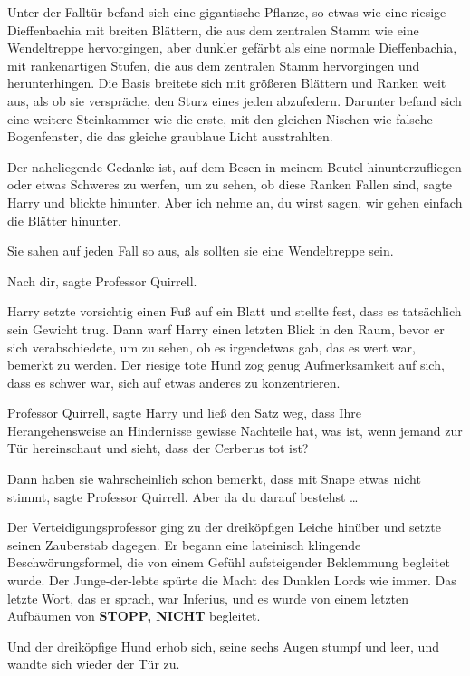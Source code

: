 Unter der Falltür befand sich eine gigantische Pflanze, so etwas wie eine
riesige Dieffenbachia mit breiten Blättern, die aus dem zentralen Stamm wie eine
Wendeltreppe hervorgingen, aber dunkler gefärbt als eine normale Dieffenbachia,
mit rankenartigen Stufen, die aus dem zentralen Stamm hervorgingen und
herunterhingen. Die Basis breitete sich mit größeren Blättern und Ranken weit
aus, als ob sie verspräche, den Sturz eines jeden abzufedern. Darunter befand
sich eine weitere Steinkammer wie die erste, mit den gleichen Nischen wie
falsche Bogenfenster, die das gleiche graublaue Licht ausstrahlten.

\glqq{}Der naheliegende Gedanke ist, auf dem Besen in meinem Beutel
hinunterzufliegen oder etwas Schweres zu werfen, um zu sehen, ob diese Ranken
Fallen sind\grqq{}, sagte Harry und blickte hinunter. \glqq{}Aber ich nehme an,
du wirst sagen, wir gehen einfach die Blätter hinunter.\grqq{}

Sie sahen auf jeden Fall so aus, als sollten sie eine Wendeltreppe sein.

\glqq{}Nach dir\grqq{}, sagte Professor Quirrell.

Harry setzte vorsichtig einen Fuß auf ein Blatt und stellte fest, dass es
tatsächlich sein Gewicht trug. Dann warf Harry einen letzten Blick in den Raum,
bevor er sich verabschiedete, um zu sehen, ob es irgendetwas gab, das es wert
war, bemerkt zu werden. Der riesige tote Hund zog genug Aufmerksamkeit auf sich,
dass es schwer war, sich auf etwas anderes zu konzentrieren.

\glqq{}Professor Quirrell\grqq{}, sagte Harry und ließ den Satz weg, dass Ihre
Herangehensweise an Hindernisse gewisse Nachteile hat, \glqq{}was ist, wenn
jemand zur Tür hereinschaut und sieht, dass der Cerberus tot ist?\grqq{}

\glqq{}Dann haben sie wahrscheinlich schon bemerkt, dass mit Snape etwas nicht
stimmt\grqq{}, sagte Professor Quirrell. \glqq{}Aber da du darauf bestehst …\grqq{}

Der Verteidigungsprofessor ging zu der dreiköpfigen Leiche hinüber und setzte
seinen Zauberstab dagegen. Er begann eine lateinisch klingende
Beschwörungsformel, die von einem Gefühl aufsteigender Beklemmung begleitet
wurde. Der Junge-der-lebte spürte die Macht des Dunklen Lords wie immer. Das
letzte Wort, das er sprach, war \glqq{}Inferius\grqq{}, und es wurde von einem
letzten Aufbäumen von \textbf{STOPP, NICHT} begleitet.

Und der dreiköpfige Hund erhob sich, seine sechs Augen stumpf und leer, und
wandte sich wieder der Tür zu.

